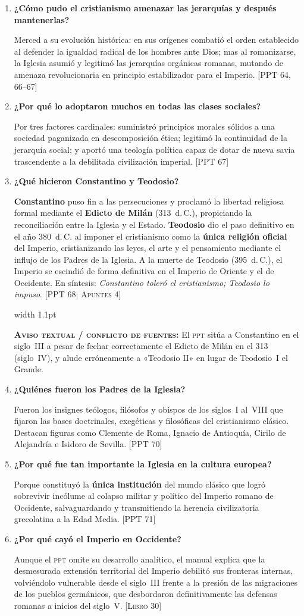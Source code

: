 \documentclass[11pt,letterpaper]{article}
\newcommand{\fuente}[1]{\nolinebreak\hfill{\footnotesize\color{black!55}\textsc{[#1]}}}
\newcommand{\aviso}[1]{%
  \par\vspace{0.3em}%
  \noindent\hspace*{0.8em}%
  {\color{black!40}\vrule width 1.1pt}\hspace{0.7em}%
  \parbox{\dimexpr\linewidth-2.2em}{%
    \footnotesize\color{black!75}%
    \textbf{\textsc{Aviso textual / conflicto de fuentes:}} #1%
  }%
  \par\vspace{0.3em}%
}
\newcommand{\preg}[1]{\item \textbf{#1}\par\nopagebreak\vspace{0.2em}}
\begin{document}
\begin{enumerate}[resume]
  \preg{¿Cómo pudo el cristianismo amenazar las jerarquías y después mantenerlas?}
  Merced a su evolución histórica: en sus orígenes combatió el orden establecido al defender la igualdad radical de los hombres ante Dios; mas al romanizarse, la Iglesia asumió y legitimó las jerarquías orgánicas romanas, mutando de amenaza revolucionaria en principio estabilizador para el Imperio. \fuente{PPT 64, 66--67}

  \preg{¿Por qué lo adoptaron muchos en todas las clases sociales?}
  Por tres factores cardinales: suministró principios morales sólidos a una sociedad paganizada en descomposición ética; legitimó la continuidad de la jerarquía social; y aportó una teología política capaz de dotar de nueva savia trascendente a la debilitada civilización imperial. \fuente{PPT 67}

  \preg{¿Qué hicieron Constantino y Teodosio?}
  \textbf{Constantino} puso fin a las persecuciones y proclamó la libertad religiosa formal mediante el \textbf{Edicto de Milán} (313~d.\,C.), propiciando la reconciliación entre la Iglesia y el Estado. \textbf{Teodosio} dio el paso definitivo en el año 380~d.\,C. al imponer el cristianismo como la \textbf{única religión oficial} del Imperio, cristianizando las leyes, el arte y el pensamiento mediante el influjo de los Padres de la Iglesia. A la muerte de Teodosio (395~d.\,C.), el Imperio se escindió de forma definitiva en el Imperio de Oriente y el de Occidente. En síntesis: \emph{Constantino toleró el cristianismo; Teodosio lo impuso}. \fuente{PPT 68; Apuntes 4}
  \aviso{El \textsc{ppt} sitúa a Constantino en el siglo~III a pesar de fechar correctamente el Edicto de Milán en el 313 (siglo~IV), y alude erróneamente a «Teodosio II» en lugar de Teodosio~I el Grande.}

  \preg{¿Quiénes fueron los Padres de la Iglesia?}
  Fueron los insignes teólogos, filósofos y obispos de los siglos~I al~VIII que fijaron las bases doctrinales, exegéticas y filosóficas del cristianismo clásico. Destacan figuras como Clemente de Roma, Ignacio de Antioquía, Cirilo de Alejandría e Isidoro de Sevilla. \fuente{PPT 70}

  \preg{¿Por qué fue tan importante la Iglesia en la cultura europea?}
  Porque constituyó la \textbf{única institución} del mundo clásico que logró sobrevivir incólume al colapso militar y político del Imperio romano de Occidente, salvaguardando y transmitiendo la herencia civilizatoria grecolatina a la Edad Media. \fuente{PPT 71}

  \preg{¿Por qué cayó el Imperio en Occidente?}
  Aunque el \textsc{ppt} omite su desarrollo analítico, el manual explica que la desmesurada extensión territorial del Imperio debilitó sus fronteras internas, volviéndolo vulnerable desde el siglo~III frente a la presión de las migraciones de los pueblos germánicos, que desbordaron definitivamente las defensas romanas a inicios del siglo~V. \fuente{Libro 30}
\end{enumerate}
\end{document}
